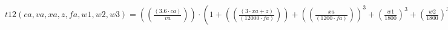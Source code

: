 \documentclass[preview,border=1pt]{standalone}
\begin{document}
$
t12 (ca,va,xa,z,fa,w1,w2,w3) = \left(\left(\frac{\left(\num{3.6}\cdot ca\right)}{va}\right)\right)\cdot \left(\num{1}+\left(\left(\frac{\left(\num{3}\cdot xa+z\right)}{\left(\num{12000}\cdot fa\right)}\right)\right)+\left(\left(\frac{xa}{\left(\num{1200}\cdot fa\right)}\right)\right)^{\num{3}}+\left(\frac{w1}{\num{1800}}\right)^{\num{3}}+\left(\frac{w2}{\num{1800}}\right)^{\num{3}}+\left(\frac{w3}{\num{1800}}\right)^{\num{3}}+\left(\frac{z}{\left(\num{2000}\cdot fa\right)}\right)^{\num{3}}\right)
$
\end{document}
